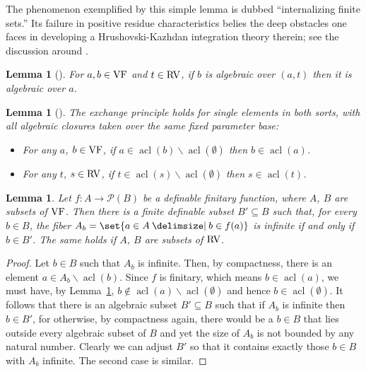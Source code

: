 \documentclass[12pt]{amsart}
\theoremstyle{plain}
\newtheorem{lem}[thm]{Lemma}
\theoremstyle{definition}
\theoremstyle{remark}
\numberwithin{equation}{section}
\theoremstyle{plain}
\newcommand{\VF}{\textup{VF}}
\newcommand{\RV}{\textup{RV}}
\DeclareMathOperator{\acl}{acl}
\newcommand{\0}{\emptyset}
\newcommand{\mdl}[1]{\mathcal{#1}}  %
\newcommand{\fun}{\longrightarrow}
\newcommand{\sub}{\subseteq}
\newcommand{\mi}{\smallsetminus}
\providecommand\given{}
\newcommand\SetSymbol[1][]{%
\nonscript \: #1 \vert
\allowbreak
\nonscript\:
\mathopen{}}
\renewcommand\given{\SetSymbol[\delimsize]}
\begin{document}
The phenomenon exemplified by this simple lemma is dubbed ``internalizing finite sets.'' Its failure in positive residue characteristics belies the deep obstacles one faces in developing a Hrushovski-Kazhdan integration theory therein; see the discussion around \cite[Lemma~3.9]{hrushovski:kazhdan:integration:vf}.

\begin{lem}[{\cite[Lemma~3.3]{Yin:special:trans}}]\label{dcl:to:ac}
For $a, b \in \VF$ and $t \in \RV$, if $b$ is algebraic over $(a, t)$ then it is algebraic over $a$.
\end{lem}

\begin{lem}[{\cite[Lemma~4.3]{Yin:QE:ACVF:min}}]\label{exchange}
The exchange principle holds for single elements in both sorts, with all algebraic closures taken over the same fixed parameter base:
\begin{itemize}
 \item For any $a$, $b \in \VF$, if $a \in \acl(b) \mi \acl(\0)$ then $b \in \acl(a)$.
 \item For any $t$, $s \in \RV$, if $t \in \acl(s) \mi \acl(\0)$ then $s \in \acl(t)$.
\end{itemize}
\end{lem}


\begin{lem}\label{finite:fib:def}
Let $f : A \fun \mdl P(B)$ be a definable finitary function, where $A$, $B$ are subsets of $\VF$. Then there is a finite definable subset $B' \sub B$ such that, for every $b \in B$, the fiber $A_b = \set{a \in A \given b \in f(a)}$ is infinite if and only if  $b \in B'$. The same holds if $A$, $B$ are subsets of $\RV$.
\end{lem}
\begin{proof}
Let $b \in B$ such that $A_b$ is infinite. Then, by compactness, there is an element $a \in A_b \mi \acl(b)$. Since $f$ is finitary, which means $b \in \acl(a)$, we must have, by Lemma~\ref{exchange},  $b \notin \acl(a) \mi \acl(\0)$ and hence $b \in \acl(\0)$. It follows that there is an algebraic subset $B' \sub B$ such that if $A_b$ is infinite then $b \in B'$, for otherwise, by compactness again, there would be a $b \in B$ that lies outside every algebraic subset of $B$ and yet the size of $A_b$ is not bounded by any natural number. Clearly we can adjust $B'$ so that it contains exactly those $b \in  B$ with $A_b$ infinite. The second case is similar.
\end{proof}
\end{document}
